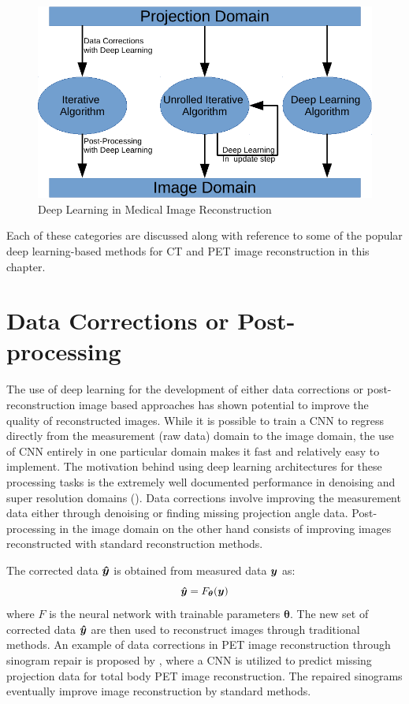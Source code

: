 \begin{figure}[!htbp]
	\centering
	\includegraphics[width=0.8\linewidth]{./Figures/dl_mi.pdf}
	\caption{Deep Learning in Medical Image Reconstruction}
	\label{fig:dl}
\end{figure}


Each of these categories are discussed along with reference to some of the popular deep learning-based methods for \ac{CT} and \ac{PET} image reconstruction in this chapter. 

\section{Data Corrections or Post-processing}

The use of deep learning for the development of either data corrections or post-reconstruction  image based approaches has shown potential to improve the quality of reconstructed images. While it is possible to train a \ac{CNN} to regress directly from the measurement (raw data) domain to the image domain, the use of \ac{CNN} entirely in one particular domain makes it fast and relatively easy to implement. The motivation behind using deep learning architectures for these processing tasks is the extremely well documented performance in denoising and super resolution domains (\cite{tian2020deep,wang2020deep}). Data corrections involve improving the measurement data either through denoising or finding missing projection angle data. Post-processing in the image domain on the other hand consists of improving images reconstructed with standard reconstruction methods. 

The corrected data $\bm{\hat{y}}$ is obtained from measured data $\bm{y}$ as: 
\begin{equation}\label{eq:data_cor}
	\bm{\hat{y}} = F_{\bm{\theta}} (\bm{y})
\end{equation} 
where $F$ is the neural network with trainable parameters $\bm{\theta}$. 
The new set of corrected data $\bm{\hat{y}}$ are then used to reconstruct images through traditional methods. An example of data corrections in \ac{PET} image reconstruction through sinogram repair is proposed by \cite{whiteley2019cnn}, where a \ac{CNN} is utilized to predict missing projection data for total body \ac{PET} image reconstruction. The repaired sinograms eventually improve image reconstruction by standard methods.

